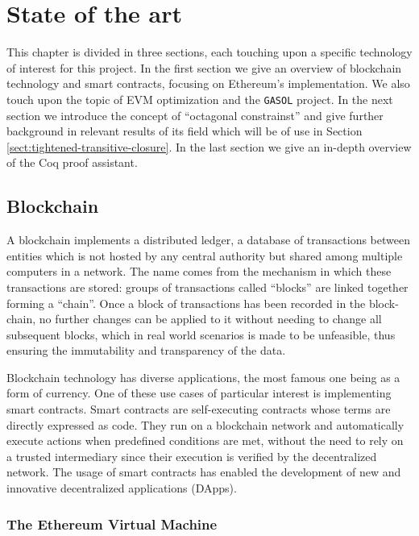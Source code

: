 \chapter{State of the art}
\label{cap:state-of-the-art}

This chapter is divided in three sections, each touching upon a specific
technology of interest for this project. In the first section we give an
overview of blockchain technology and smart contracts, focusing on Ethereum's
implementation. We also touch upon the topic of EVM optimization and the 
\verb|GASOL| project. In the next section we introduce the concept of 
``octagonal constrainst'' and give further background in relevant results of
its field which will be of use in Section \ref{sect:tightened-transitive-closure}.
In the last section we give an in-depth overview of the Coq proof assistant.

\section{Blockchain}
\label{sect:blockchain}

A blockchain implements a distributed ledger, a database of transactions
between entities which is not hosted by any central authority but shared
among multiple computers in a network. The name comes from the mechanism
in which these transactions are stored: groups of transactions called
``blocks'' are linked together forming a ``chain''. Once a block of 
transactions has been recorded in the block-chain, no further changes can
be applied to it without needing to change all subsequent blocks, which in
real world scenarios is made to be unfeasible, thus ensuring the immutability
and transparency of the data.


Blockchain technology has diverse applications, the most famous one being
as a form of currency. One of these use cases of particular interest is 
implementing smart contracts. Smart contracts are self-executing contracts
whose terms are directly expressed as code. They run on a blockchain 
network and automatically execute actions when predefined conditions are
met, without the need to rely on a trusted intermediary since their
execution is verified by the decentralized network. The usage of smart
contracts has enabled the development of new and innovative decentralized
applications (DApps).

\subsection{The Ethereum Virtual Machine}

